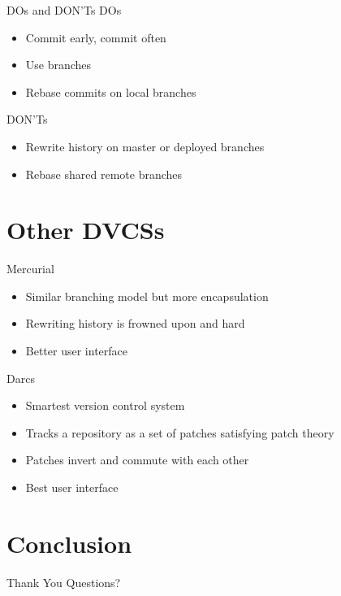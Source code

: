 \documentclass{beamer}
\begin{document}
\begin{frame}{DOs and DON'Ts}
  DOs
  \begin{itemize}
  \item Commit early, commit often
  \item Use branches
  \item Rebase commits on local branches
  \end{itemize}
  DON'Ts
  \begin{itemize}
  \item Rewrite history on master or deployed branches
  \item Rebase shared remote branches
  \end{itemize}
\end{frame}

\section{Other DVCSs}

\begin{frame}{Mercurial}
  \begin{itemize}
  \item Similar branching model but more encapsulation
  \item Rewriting history is frowned upon and hard
  \item Better user interface
  \end{itemize}
\end{frame}

\begin{frame}{Darcs}
  \begin{itemize}
  \item Smartest version control system
  \item Tracks a repository as a set of patches satisfying patch theory
  \item Patches invert and commute with each other
  \item Best user interface
  \end{itemize}
\end{frame}

\section{Conclusion}

\begin{frame}{Thank You}
  Questions?
\end{frame}
\end{document}
